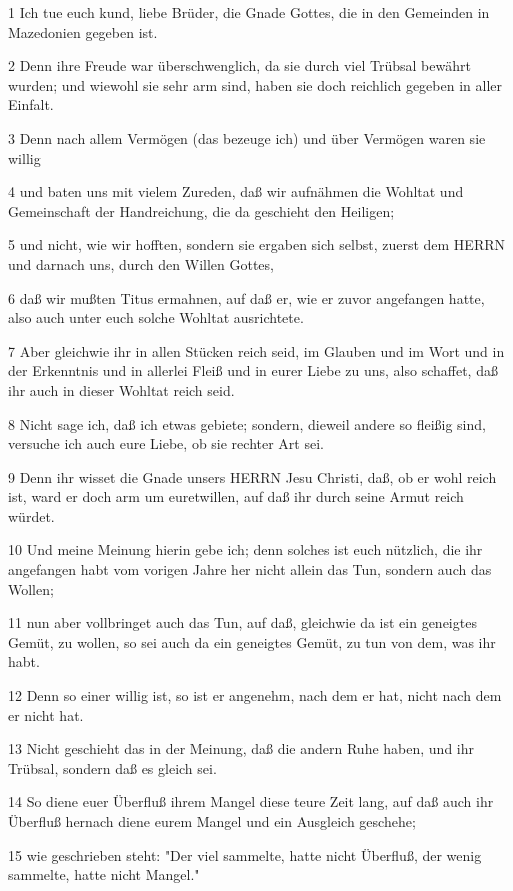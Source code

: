 \par 1 Ich tue euch kund, liebe Brüder, die Gnade Gottes, die in den Gemeinden in Mazedonien gegeben ist.
\par 2 Denn ihre Freude war überschwenglich, da sie durch viel Trübsal bewährt wurden; und wiewohl sie sehr arm sind, haben sie doch reichlich gegeben in aller Einfalt.
\par 3 Denn nach allem Vermögen (das bezeuge ich) und über Vermögen waren sie willig
\par 4 und baten uns mit vielem Zureden, daß wir aufnähmen die Wohltat und Gemeinschaft der Handreichung, die da geschieht den Heiligen;
\par 5 und nicht, wie wir hofften, sondern sie ergaben sich selbst, zuerst dem HERRN und darnach uns, durch den Willen Gottes,
\par 6 daß wir mußten Titus ermahnen, auf daß er, wie er zuvor angefangen hatte, also auch unter euch solche Wohltat ausrichtete.
\par 7 Aber gleichwie ihr in allen Stücken reich seid, im Glauben und im Wort und in der Erkenntnis und in allerlei Fleiß und in eurer Liebe zu uns, also schaffet, daß ihr auch in dieser Wohltat reich seid.
\par 8 Nicht sage ich, daß ich etwas gebiete; sondern, dieweil andere so fleißig sind, versuche ich auch eure Liebe, ob sie rechter Art sei.
\par 9 Denn ihr wisset die Gnade unsers HERRN Jesu Christi, daß, ob er wohl reich ist, ward er doch arm um euretwillen, auf daß ihr durch seine Armut reich würdet.
\par 10 Und meine Meinung hierin gebe ich; denn solches ist euch nützlich, die ihr angefangen habt vom vorigen Jahre her nicht allein das Tun, sondern auch das Wollen;
\par 11 nun aber vollbringet auch das Tun, auf daß, gleichwie da ist ein geneigtes Gemüt, zu wollen, so sei auch da ein geneigtes Gemüt, zu tun von dem, was ihr habt.
\par 12 Denn so einer willig ist, so ist er angenehm, nach dem er hat, nicht nach dem er nicht hat.
\par 13 Nicht geschieht das in der Meinung, daß die andern Ruhe haben, und ihr Trübsal, sondern daß es gleich sei.
\par 14 So diene euer Überfluß ihrem Mangel diese teure Zeit lang, auf daß auch ihr Überfluß hernach diene eurem Mangel und ein Ausgleich geschehe;
\par 15 wie geschrieben steht: "Der viel sammelte, hatte nicht Überfluß, der wenig sammelte, hatte nicht Mangel."
